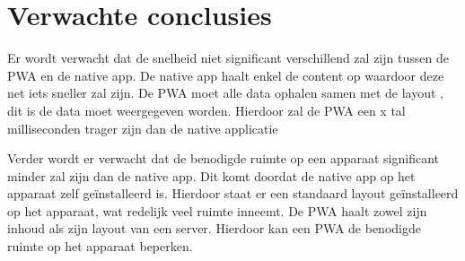 \section{Verwachte conclusies}
\label{sec:verwachte_conclusies}
Er wordt verwacht dat de snelheid niet significant verschillend zal zijn tussen de PWA en de native app. De native app haalt enkel de content op waardoor deze net iets sneller zal zijn. De PWA moet alle data ophalen samen met de layout , dit is de data moet weergegeven worden. Hierdoor zal de PWA een x tal milliseconden trager zijn dan de native applicatie

Verder wordt er verwacht dat de benodigde ruimte op een apparaat significant minder zal zijn dan de native app. Dit komt doordat de native app op het apparaat zelf geïnstalleerd is. Hierdoor staat er een standaard layout geïnstalleerd op het apparaat, wat redelijk veel ruimte inneemt. De PWA haalt zowel zijn inhoud als zijn layout van een server. Hierdoor kan een PWA de benodigde ruimte op het apparaat beperken. 


